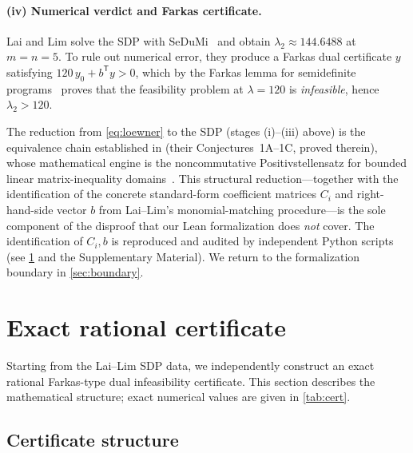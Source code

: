 \paragraph{(iv) Numerical verdict and Farkas certificate.}
Lai and Lim solve the SDP with SeDuMi~\cite{Sturm1999} and obtain
$\lambda_2\approx 144.6488$ at $m=n=5$.  To rule out numerical error,
they produce a Farkas dual certificate $y$ satisfying
$120\,y_0 + b^{\mathsf{T}}y > 0$, which by the Farkas lemma for
semidefinite programs~\cite{Lasserre2001} proves that the feasibility
problem at $\lambda=120$ is \emph{infeasible}, hence $\lambda_2>120$.

\begin{remark}\label{rem:external}
The reduction from \eqref{eq:loewner} to the SDP (stages
(i)--(iii) above) is the equivalence chain established in
\cite[\S\,3]{LaiLim2020} (their Conjectures~1A--1C, proved
therein), whose mathematical engine is the noncommutative
Positivstellensatz for bounded linear matrix-inequality
domains~\cite{Helton2002}.  This structural reduction---together
with the identification of the concrete standard-form coefficient
matrices $C_i$ and right-hand-side vector $b$ from Lai--Lim's
monomial-matching procedure---is the sole component of the
disproof that our Lean formalization does \emph{not} cover.
The identification of $C_i,b$ is reproduced and audited by
independent Python scripts (see \cref{sec:exact} and the
Supplementary Material).  We return to the formalization boundary
in \cref{sec:boundary}.
\end{remark}

\section{Exact rational certificate}\label{sec:exact}

Starting from the Lai--Lim SDP data, we independently construct an
exact rational Farkas-type dual infeasibility certificate.  This
section describes the mathematical structure; exact numerical values
are given in \cref{tab:cert}.

\subsection{Certificate structure}\label{sec:cert-structure}

